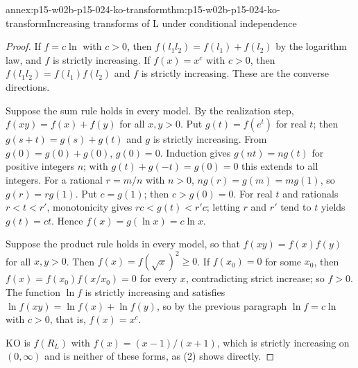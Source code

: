 \begin{annexitem}{annex:p15-w02b-p15-024-ko-transform}{thm:p15-w02b-p15-024-ko-transform}{Increasing transforms of L under conditional independence}
\begin{proof}
If \(f=c\ln\) with \(c>0\), then \(f(l_1l_2)=f(l_1)+f(l_2)\) by the
logarithm law, and \(f\) is strictly increasing. If \(f(x)=x^c\) with
\(c>0\), then \(f(l_1l_2)=f(l_1)f(l_2)\) and \(f\) is strictly
increasing. These are the converse directions.

Suppose the sum rule holds in every model. By the realization step,
\(f(xy)=f(x)+f(y)\) for all \(x,y>0\). Put \(g(t)=f(e^t)\) for real
\(t\); then \(g(s+t)=g(s)+g(t)\) and \(g\) is strictly increasing.
From \(g(0)=g(0)+g(0)\), \(g(0)=0\). Induction gives \(g(nt)=ng(t)\)
for positive integers \(n\); with \(g(t)+g(-t)=g(0)=0\) this extends
to all integers. For a rational \(r=m/n\) with \(n>0\),
\(ng(r)=g(m)=mg(1)\), so \(g(r)=rg(1)\). Put \(c=g(1)\); then
\(c>g(0)=0\). For real \(t\) and rationals \(r<t<r'\), monotonicity
gives \(rc<g(t)<r'c\); letting \(r\) and \(r'\) tend to \(t\) yields
\(g(t)=ct\). Hence \(f(x)=g(\ln x)=c\ln x\).

Suppose the product rule holds in every model, so that
\(f(xy)=f(x)f(y)\) for all \(x,y>0\). Then
\(f(x)=f(\sqrt x)^2\geq0\). If \(f(x_0)=0\) for some \(x_0\), then
\(f(x)=f(x_0)f(x/x_0)=0\) for every \(x\), contradicting strict
increase; so \(f>0\). The function \(\ln f\) is strictly increasing and
satisfies \(\ln f(xy)=\ln f(x)+\ln f(y)\), so by the previous paragraph
\(\ln f=c\ln\) with \(c>0\), that is, \(f(x)=x^c\).

KO is \(f(R_L)\) with \(f(x)=(x-1)/(x+1)\), which is strictly
increasing on \((0,\infty)\) and is neither of these forms, as (2)
shows directly.
\end{proof}
\end{annexitem}

